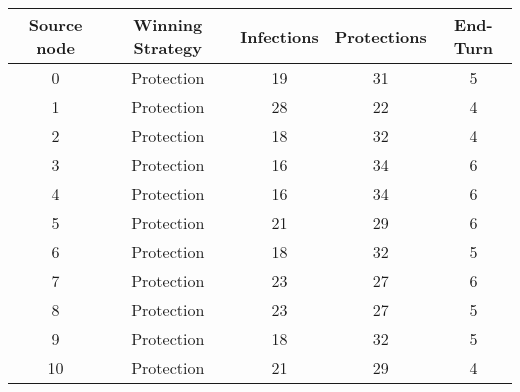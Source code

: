 \documentclass[results.tex]{subfiles}
\begin{document}
    \begin{center}
        \begin{tabular}{| c || c | c | c | c |}
            \hline
            {\bfseries Source node} & {\bfseries Winning Strategy} & {\bfseries Infections} & {\bfseries Protections}
            & {\bfseries End-Turn}
            \\  %
            \hline\hline
            0                       & Protection                   & 19                     & 31                      & 5                    \\
            \hline
            1                       & Protection                   & 28                     & 22                      & 4                    \\
            \hline
            2                       & Protection                   & 18                     & 32                      & 4                    \\
            \hline
            3                       & Protection                   & 16                     & 34                      & 6                    \\
            \hline
            4                       & Protection                   & 16                     & 34                      & 6                    \\
            \hline
            5                       & Protection                   & 21                     & 29                      & 6                    \\
            \hline
            6                       & Protection                   & 18                     & 32                      & 5                    \\
            \hline
            7                       & Protection                   & 23                     & 27                      & 6                    \\
            \hline
            8                       & Protection                   & 23                     & 27                      & 5                    \\
            \hline
            9                       & Protection                   & 18                     & 32                      & 5                    \\
            \hline
            10                      & Protection                   & 21                     & 29                      & 4                    \\

\end{tabular}
\end{center}
\end{document}
